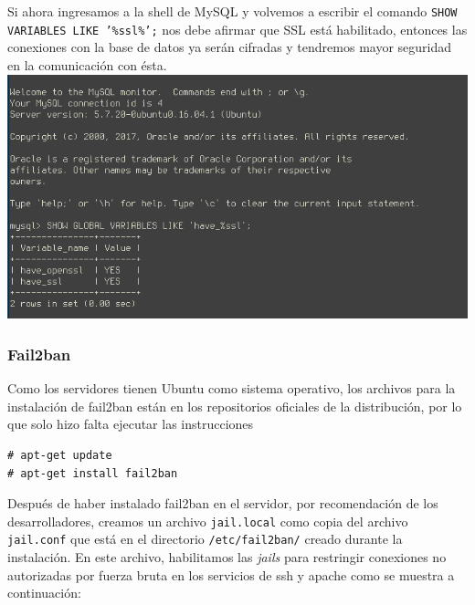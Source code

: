 \documentclass[9pt]{article}
\begin{document}
Si ahora ingresamos a la shell de \textsf{MySQL} y volvemos a escribir el comando \texttt{SHOW VARIABLES LIKE '\%ssl\%';} nos debe afirmar que \textsf{SSL} está habilitado, entonces las conexiones con la base de datos ya serán cifradas y tendremos mayor seguridad en la comunicación con ésta.
\includegraphics[width=\textwidth]{mysql_ssl-enabled}\\

\subsubsection*{Fail2ban}
Como los servidores tienen \textsf{Ubuntu} como sistema operativo, los archivos para la instalación de \textsf{fail2ban} están en los repositorios oficiales de la distribución, por lo que solo hizo falta ejecutar las instrucciones
\begin{verbatim}
# apt-get update
# apt-get install fail2ban
\end{verbatim}
Después de haber instalado \textsf{fail2ban} en el servidor, por recomendación de los desarrolladores, creamos un archivo \texttt{jail.local} como copia del archivo \texttt{jail.conf} que está en el directorio \texttt{/etc/fail2ban/} creado durante la instalación. En este archivo, habilitamos las \textit{jails} para restringir conexiones no autorizadas por fuerza bruta en los servicios de \textsf{ssh} y \textsf{apache} como se muestra a continuación:
\end{document}
